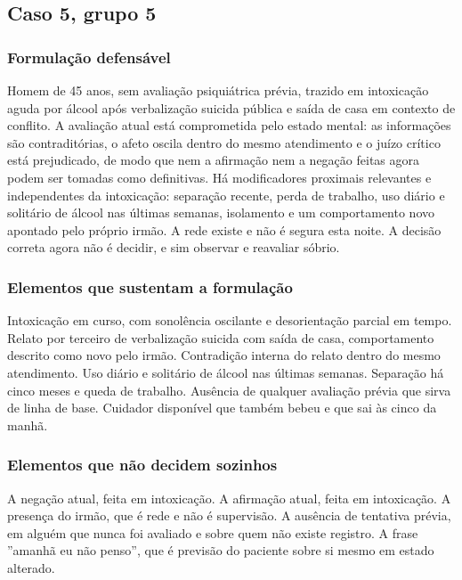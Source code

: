 \filete

\subsection*{Caso 5, grupo 5}

\subsubsection*{Formulação defensável}

Homem de 45 anos, sem avaliação psiquiátrica prévia, trazido em intoxicação aguda por álcool após verbalização suicida pública e saída de casa em contexto de conflito. A avaliação atual está comprometida pelo estado mental: as informações são contraditórias, o afeto oscila dentro do mesmo atendimento e o juízo crítico está prejudicado, de modo que nem a afirmação nem a negação feitas agora podem ser tomadas como definitivas. Há modificadores proximais relevantes e independentes da intoxicação: separação recente, perda de trabalho, uso diário e solitário de álcool nas últimas semanas, isolamento e um comportamento novo apontado pelo próprio irmão. A rede existe e não é segura esta noite. A decisão correta agora não é decidir, e sim observar e reavaliar sóbrio.

\subsubsection*{Elementos que sustentam a formulação}

Intoxicação em curso, com sonolência oscilante e desorientação parcial em tempo. Relato por terceiro de verbalização suicida com saída de casa, comportamento descrito como novo pelo irmão. Contradição interna do relato dentro do mesmo atendimento. Uso diário e solitário de álcool nas últimas semanas. Separação há cinco meses e queda de trabalho. Ausência de qualquer avaliação prévia que sirva de linha de base. Cuidador disponível que também bebeu e que sai às cinco da manhã.

\subsubsection*{Elementos que não decidem sozinhos}

A negação atual, feita em intoxicação. A afirmação atual, feita em intoxicação. A presença do irmão, que é rede e não é supervisão. A ausência de tentativa prévia, em alguém que nunca foi avaliado e sobre quem não existe registro. A frase ''amanhã eu não penso'', que é previsão do paciente sobre si mesmo em estado alterado.


